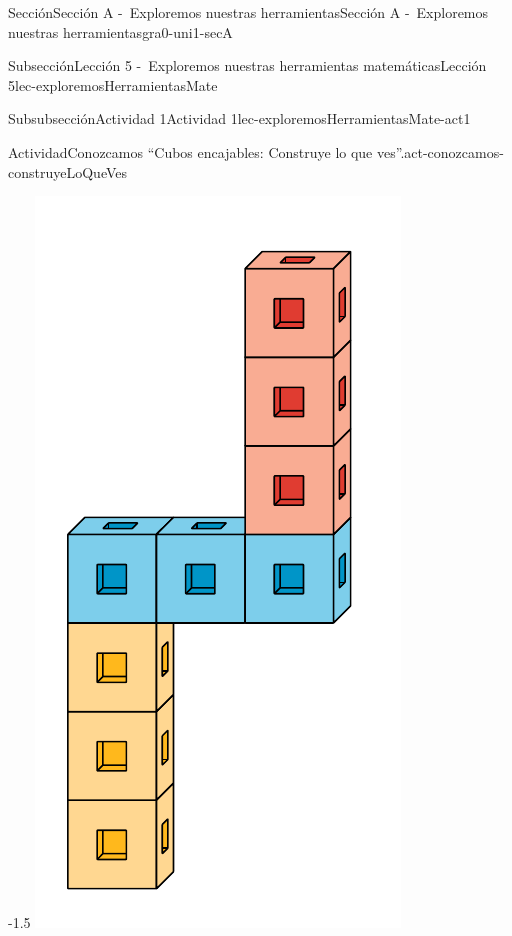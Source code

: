 \documentclass[twoside,10pt,]{article}
\begin{document}
\begin{sectionptx}{Sección}{Sección A -~Exploremos nuestras herramientas}{}{Sección A -~Exploremos nuestras herramientas}{}{}{gra0-uni1-secA}
\begin{subsectionptx}{Subsección}{Lección 5 -~Exploremos nuestras herramientas matemáticas}{}{Lección 5}{}{}{lec-exploremosHerramientasMate}
\begin{subsubsectionptx}{Subsubsección}{Actividad 1}{}{Actividad 1}{}{}{lec-exploremosHerramientasMate-act1}
\begin{activity}{Actividad}{Conozcamos “Cubos encajables: Construye lo que ves”.}{act-conozcamos-construyeLoQueVes}
\begin{image}{0}{1}{0}{-1.5\baselineskip}%
\includegraphics[width=\linewidth]{external/svg-source/tikz-file-148146.pdf}
\end{image}%
\end{activity}%

\end{subsubsectionptx}
\end{subsectionptx}
\end{sectionptx}
\end{document}
